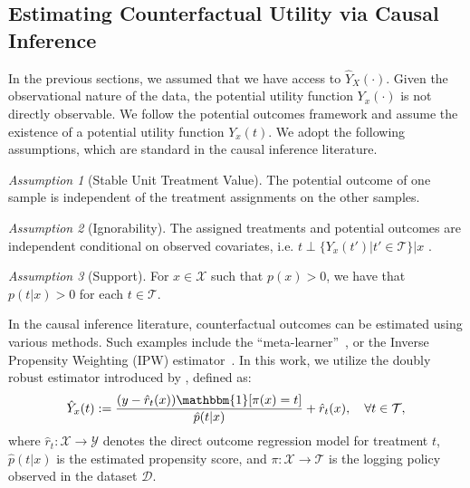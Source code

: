 \documentclass{article}
\theoremstyle{remark}
\newtheorem{assumption}{Assumption}
\begin{document}
\subsection{Estimating Counterfactual Utility via Causal Inference}\label{sect_DR}

In the previous sections, we assumed that we have access to $\hat{Y}_X(\cdot)$. Given the observational nature of the data, the potential utility function $Y_x(\cdot)$ is not directly observable. We follow the potential outcomes framework \cite{rosenbaum1983central, rubin1984bayesianly} and assume the existence of a potential utility function $Y_x(t)$. %
We adopt the following assumptions, which are standard in the causal inference literature.


\begin{assumption}[Stable Unit Treatment Value]
The potential outcome of one sample is independent of the treatment assignments on the other samples.
\end{assumption}

\begin{assumption}[Ignorability]
The assigned treatments and potential outcomes are independent conditional on observed covariates, i.e. $t\perp \{Y_x(t')|t'\in \mathcal{T}\}|x$ .
\end{assumption}


\begin{assumption}[Support]
For $x\in \mathcal{X}$ such that $p(x)>0$, we have that $p(t|x)>0$ for each $t\in\mathcal{T}$.
\end{assumption}

In the causal inference literature, counterfactual outcomes can be estimated using various methods. Such examples include the  ``meta-learner''~\citep{kunzel2019metalearners}, or the Inverse Propensity Weighting (IPW) estimator~\citep{horvitz1952generalization}. In this work, we utilize the doubly robust estimator introduced by \cite{dudik2011doubly}, defined as: 
\begin{align} \hat{Y}_x(t) := \frac{(y - \hat{r}_{t}(x)) \mathbbm{1}[\pi(x) = t]}{\hat{p}(t|x)} + \hat{r}_{t}(x), \quad \forall t \in \mathcal{T}, \end{align} 
\noindent where $\hat{r}_{t} : \mathcal{X} \to \mathcal{Y}$ denotes the direct outcome regression model for treatment $t$, $\hat{p}(t|x)$ is the estimated propensity score, and $\pi : \mathcal{X} \to \mathcal{T}$ is the logging policy observed in the dataset $\mathcal{D}$.
\end{document}
